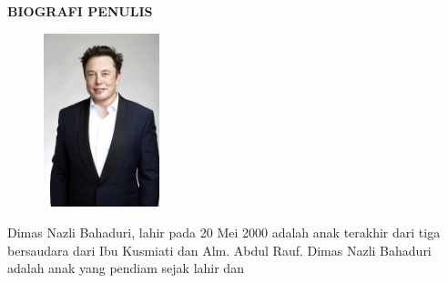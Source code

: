\begin{center}
  \Large
  \textbf{BIOGRAFI PENULIS}
\end{center}


\vspace{2ex}

\begin{figure}
  \centering
  \vspace{-3ex}
  \includegraphics[width=0.3\textwidth]{gambar/elon.jpg}
  \vspace{-4ex}
\end{figure}

Dimas Nazli Bahaduri, lahir pada 20 Mei 2000 adalah anak terakhir dari tiga bersaudara dari Ibu Kusmiati dan Alm. Abdul Rauf. Dimas Nazli Bahaduri adalah anak yang pendiam sejak lahir dan 

